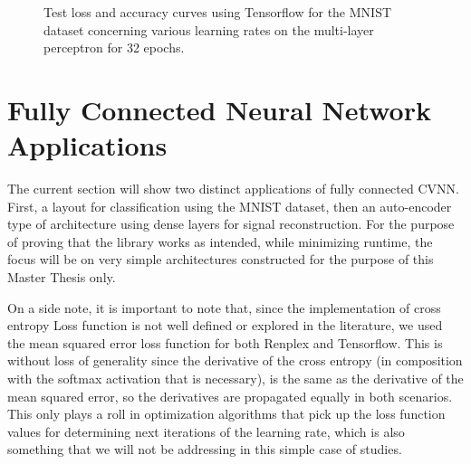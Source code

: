 \begin{figure}[htbp]
	\centering
	\caption{Test loss and accuracy curves using Tensorflow for the MNIST dataset concerning various learning rates on the multi-layer perceptron for 32 epochs.}
	\label{fig:lr_dense_mnist_tf}
\end{figure}

\section{Fully Connected Neural Network Applications}
The current section will show two distinct applications of fully connected CVNN. First, a layout for classification using the MNIST dataset, then an auto-encoder type of architecture using dense layers for signal reconstruction. For the purpose of proving that the library works as intended, while minimizing runtime, the focus will be on very simple architectures constructed for the purpose of this Master Thesis only.

On a side note, it is important to note that, since the implementation of cross entropy Loss function is not well defined or explored in the literature, we used the mean squared error loss function for both Renplex and Tensorflow. This is without loss of generality since the derivative of the cross entropy (in composition with the softmax activation that is necessary), is the same as the derivative of the mean squared error, so the derivatives are propagated equally in both scenarios. This only plays a roll in optimization algorithms that pick up the loss function values for determining next iterations of the learning rate, which is also something that we will not be addressing in this simple case of studies.

